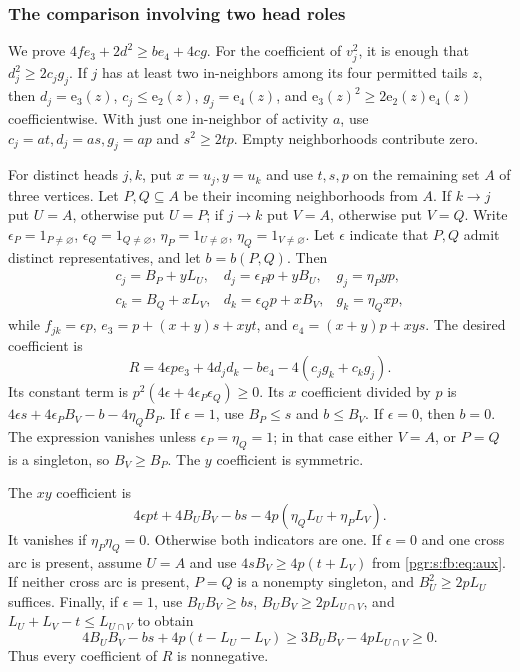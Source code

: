 \documentclass[11pt]{article}
\numberwithin{equation}{section}
\theoremstyle{definition}\newtheorem{definition}[theorem]{Definition}\newtheorem{remark}[theorem]{Remark}
\newcommand{\ee}{\mathrm e}                %
\begin{document}
\subsubsection{The comparison involving two head roles}
We prove $4fe_3+2d^2\ge be_4+4cg$. For the coefficient of $v_j^2$, it is enough that $d_j^2\ge2c_jg_j$. If $j$ has at least two in-neighbors among its four permitted tails $z$, then $d_j=\ee_3(z)$, $c_j\le\ee_2(z)$, $g_j=\ee_4(z)$, and
$\ee_3(z)^2\ge2\ee_2(z)\ee_4(z)$ coefficientwise. With just one in-neighbor of activity $a$, use $c_j=at,d_j=as,g_j=ap$ and $s^2\ge2tp$. Empty neighborhoods contribute zero.

For distinct heads $j,k$, put $x=u_j,y=u_k$ and use $t,s,p$ on the remaining set $A$ of three vertices. Let $P,Q\subseteq A$ be their incoming neighborhoods from $A$. If $k\to j$ put $U=A$, otherwise put $U=P$; if $j\to k$ put $V=A$, otherwise put $V=Q$. Write $\epsilon_P=1_{P\ne\varnothing}$, $\epsilon_Q=1_{Q\ne\varnothing}$, $\eta_P=1_{U\ne\varnothing}$, $\eta_Q=1_{V\ne\varnothing}$. Let $\epsilon$ indicate that $P,Q$ admit distinct representatives, and let $b=b(P,Q)$. Then
\[
\begin{array}{lll}
 c_j=B_P+yL_U,&d_j=\epsilon_Pp+yB_U,&g_j=\eta_Pyp,\\
 c_k=B_Q+xL_V,&d_k=\epsilon_Qp+xB_V,&g_k=\eta_Qxp,
\end{array}
\]
while $f_{jk}=\epsilon p$, $e_3=p+(x+y)s+xyt$, and $e_4=(x+y)p+xys$.
The desired coefficient is
\[
 R=4\epsilon pe_3+4d_jd_k-be_4-4(c_jg_k+c_kg_j).
\]
Its constant term is $p^2(4\epsilon+4\epsilon_P\epsilon_Q)\ge0$.
Its $x$ coefficient divided by $p$ is
$4\epsilon s+4\epsilon_PB_V-b-4\eta_QB_P$.
If $\epsilon=1$, use $B_P\le s$ and $b\le B_V$. If $\epsilon=0$, then $b=0$. The expression vanishes unless $\epsilon_P=\eta_Q=1$; in that case either $V=A$, or $P=Q$ is a singleton, so $B_V\ge B_P$. The $y$ coefficient is symmetric.

The $xy$ coefficient is
\[
 4\epsilon pt+4B_UB_V-bs-4p(\eta_QL_U+\eta_PL_V).
\]
It vanishes if $\eta_P\eta_Q=0$. Otherwise both indicators are one. If $\epsilon=0$ and one cross arc is present, assume $U=A$ and use $4sB_V\ge4p(t+L_V)$ from \eqref{pgr:s:fb:eq:aux}. If neither cross arc is present, $P=Q$ is a nonempty singleton, and $B_U^2\ge2pL_U$ suffices. Finally, if $\epsilon=1$, use $B_UB_V\ge bs$, $B_UB_V\ge2pL_{U\cap V}$, and $L_U+L_V-t\le L_{U\cap V}$ to obtain
\[
 4B_UB_V-bs+4p(t-L_U-L_V)
 \ge3B_UB_V-4pL_{U\cap V}\ge0.
\]
Thus every coefficient of $R$ is nonnegative.
\end{document}
